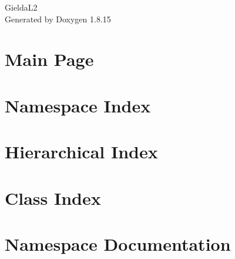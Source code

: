 \let\mypdfximage\pdfximage\def\pdfximage{\immediate\mypdfximage}\documentclass[twoside]{book}
\newcommand{\+}{\discretionary{\mbox{\scriptsize$\hookleftarrow$}}{}{}}
\newcommand{\clearemptydoublepage}{%
  \newpage{\pagestyle{empty}\cleardoublepage}%
}
\begin{document}
\hypersetup{pageanchor=false,
             bookmarksnumbered=true,
             pdfencoding=unicode
            }
\begin{titlepage}
\vspace*{7cm}
\begin{center}%
{\Large Gielda\+L2 }\\
\vspace*{1cm}
{\large Generated by Doxygen 1.8.15}\\
\end{center}
\end{titlepage}
\clearemptydoublepage
{}
\tableofcontents
\clearemptydoublepage
{}
\hypersetup{pageanchor=true}

\chapter{Main Page}
\label{index}\hypertarget{index}{}
\chapter{Namespace Index}

\chapter{Hierarchical Index}

\chapter{Class Index}

\chapter{Namespace Documentation}





















\end{document}
